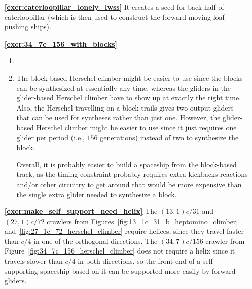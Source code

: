 \begin{multicols}{2}
\begin{itemize}[leftmargin=0em]
		
		\item[\bf\color{ocre}\sffamily\ref{exer:caterloopillar_lonely_lwss}] It creates a seed for back half of caterloopillar (which is then used to construct the forward-moving loaf-pushing ships).\\
		
		
		\item[\bf\color{ocre}\sffamily\ref{exer:34_7c_156_with_blocks}] \begin{enumerate}[leftmargin=1.5em,label=\bf\color{ocre}(\alph*)]
			\item {}\\[0.3em]
			
			\item The block-based Herschel climber might be easier to use since the blocks can be synthesized at essentially any time, whereas the gliders in the glider-based Herschel climber have to show up at exactly the right time. Also, the Herschel travelling on a block trails gives two output gliders that can be used for syntheses rather than just one. However, the glider-based Herschel climber might be easier to use since it just requires one glider per period (i.e., $156$ generations) instead of two to synthesize the block.
			
			Overall, it is probably easier to build a spaceship from the block-based track, as the timing constraint probably requires extra kickbacks reactions and/or other circuitry to get around that would be more expensive than the single extra glider needed to synthesize a block.\\
		\end{enumerate}
	
		\item[\bf\color{ocre}\sffamily\ref{exer:make_self_support_need_helix}] The $(13,1)c/31$ and $(27,1)c/72$ crawlers from Figures~\ref{fig:13_1c_31_b_heptomino_climber} and~\ref{fig:27_1c_72_herschel_climber} require helices, since they travel faster than $c/4$ in one of the orthogonal directions. The $(34,7)c/156$ crawler from Figure~\ref{fig:34_7c_156_herschel_climber} does not require a helix since it travels slower than $c/4$ in both directions, so the front-end of a self-supporting spaceship based on it can be supported more easily by forward gliders.\\
		

\end{itemize}
\end{multicols}
